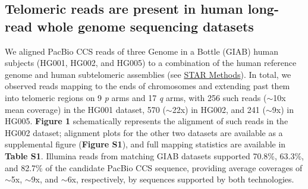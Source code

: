 \documentclass{article}
\begin{document}
\subsection*{Telomeric reads are present in human long-read whole genome sequencing datasets}
We aligned PacBio CCS reads of three Genome in a Bottle (GIAB) human subjects (HG001, HG002, and HG005) to a combination of the human reference genome and human subtelomeric assemblies (see \hyperref[sec:methods]{STAR Methods}).
In total, we observed reads mapping to the ends of chromosomes and extending past them into telomeric regions on 9 \textit{p} arms and 17 \textit{q} arms, with 256 such reads ($\sim$10x mean coverage) in the HG001 dataset, 570 ($\sim$22x) in HG002, and 241 ($\sim$9x) in HG005.
\textbf{Figure 1} schematically represents the alignment of such reads in the HG002 dataset; alignment plots for the other two datasets are available as a supplemental figure (\textbf{Figure S1}), and full mapping statistics are available in \textbf{Table S1}.
Illumina reads from matching GIAB datasets supported 70.8\%, 63.3\%, and 82.7\% of the candidate PacBio CCS sequence, %
providing average coverages of $\sim$5x, $\sim$9x, and $\sim$6x, respectively, by sequences supported by both technologies.
\end{document}
